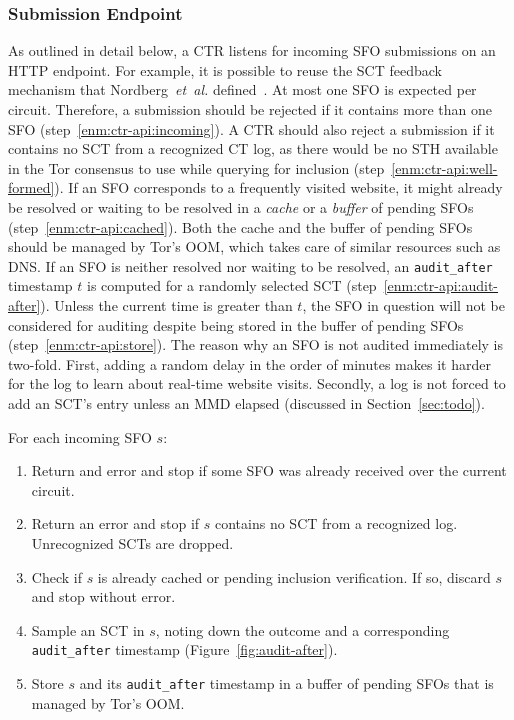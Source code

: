 \subsubsection{Submission Endpoint} \label{sec:design:api}
As outlined in detail below, a CTR listens for incoming SFO submissions on an
HTTP endpoint.  For example, it is possible to reuse the SCT feedback mechanism
that Nordberg~\emph{et~al.} defined~\cite{nordberg}.  At most one SFO is
expected per circuit.  Therefore, a submission should be rejected if it
contains more than one SFO (step~\ref{enm:ctr-api:incoming}).
A CTR should also reject a submission if it contains no SCT from a recognized CT
log, as there would be no STH available in the Tor consensus to use while
querying for inclusion (step~\ref{enm:ctr-api:well-formed}).
If an SFO corresponds to a frequently visited website, it might already be
resolved or waiting to be resolved in a \emph{cache} or a \emph{buffer} of
pending SFOs (step~\ref{enm:ctr-api:cached}).
Both the cache and the buffer of pending SFOs should be managed by Tor's OOM,
which takes care of similar resources such as DNS.  If an SFO is neither
resolved nor waiting to be resolved, an \texttt{audit\_after} timestamp $t$ is
computed for a randomly selected SCT (step~\ref{enm:ctr-api:audit-after}).
Unless the current time is greater than $t$, the SFO in question will not be
considered for auditing despite being stored in the buffer of pending SFOs
(step~\ref{enm:ctr-api:store}).
The reason why an SFO is not audited immediately is two-fold.  First, adding a
random delay in the order of minutes makes it harder for the log to learn about
real-time website visits.  Secondly, a log is not forced to add an SCT's entry
unless an MMD elapsed (discussed in Section~\ref{sec:todo}).

For each incoming SFO $s$:
\begin{enumerate}
	\item\label{enm:ctr-api:incoming} Return and error and stop if some SFO was
		already received over the current circuit.
	\item\label{enm:ctr-api:well-formed} Return an error and stop if $s$
		contains no SCT from a recognized log.  Unrecognized SCTs are dropped.
	\item\label{enm:ctr-api:cached} Check if $s$ is already cached or pending
		inclusion verification.  If so, discard $s$ and stop without error.
	\item\label{enm:ctr-api:audit-after} Sample an SCT in $s$, noting down the
		outcome and a corresponding \texttt{audit\_after} timestamp
		(Figure~\ref{fig:audit-after}).
	\item\label{enm:ctr-api:store} Store $s$ and its \texttt{audit\_after}
		timestamp in a buffer of pending SFOs that is managed by Tor's OOM.
\end{enumerate}

